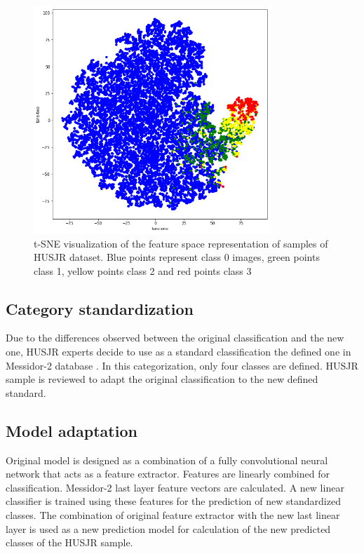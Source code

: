 \begin{figure}[!htb]
	\centering
	\includegraphics[width=0.8\textwidth]{Figures/chapter_reus/feature_space_reus.png}
	\caption[Feature space visualization of HUSJR dataset]{t-SNE visualization of the feature space representation of samples of HUSJR dataset. Blue points represent class 0 images, green points class 1, yellow points class 2 and red points class 3}
	\label{inf:fig:featspace}
\end{figure}


\subsection{Category standardization}

Due to the differences observed between the original classification and the new one, HUSJR experts decide to use as a standard classification the defined one in Messidor-2 database \citep{decenciere_feedback_2014}. In this categorization, only four classes are defined. HUSJR sample is reviewed to adapt the original classification to the new defined standard. 

\subsection{Model adaptation}

Original model is designed as a combination of a fully convolutional neural network that acts as a feature extractor. Features are linearly combined for classification. Messidor-2 last layer feature vectors are calculated. A new linear classifier is trained using these features for the prediction of new standardized classes. The combination of original feature extractor with the new last linear layer is used as a new prediction model for calculation of the new predicted classes of the HUSJR sample.


